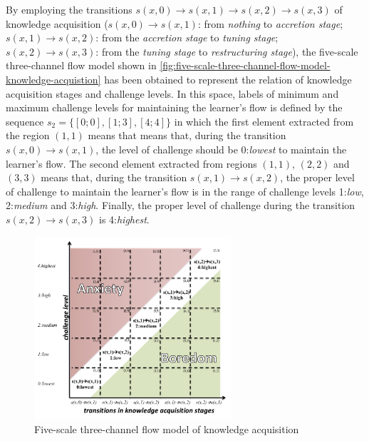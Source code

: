 By employing the transitions $s(x,0) \to s(x,1) \to s(x,2) \to s(x,3)$ of knowledge acquisition ($s(x,0) \to s(x,1)$: from \emph{nothing} to \emph{accretion stage}; $s(x,1) \to s(x,2)$: from the \emph{accretion stage} to \emph{tuning stage}; $s(x,2) \to s(x,3)$: from the \emph{tuning stage} to \emph{restructuring stage}), the five-scale three-channel flow model shown in \autoref{fig:five-scale-three-channel-flow-model-knowledge-acquistion} has been obtained to represent the relation of knowledge acquisition stages and challenge levels. In this space, labels of minimum and maximum challenge levels for maintaining the learner’s flow is defined by the sequence $s_{2} = \{[0;0], [1;3], [4;4]\}$ in which the first element \aspas{$[0;0]$} extracted from the region $(1,1)$ means that means that, during the transition $s(x,0) \to s(x,1)$, the level of challenge should be 0:\emph{lowest} to maintain the learner’s flow. The second element \aspas{$[1;3]$} extracted from regions $(1,1)$, $(2,2)$ and $(3,3)$ means that, during the transition $s(x,1) \to s(x,2)$, the proper level of challenge to maintain the learner’s flow is in the range of challenge levels 1:\emph{low}, 2:\emph{medium} and 3:\emph{high}. Finally, the proper level of challenge during the transition $s(x,2) \to s(x,3)$ is 4:\emph{highest}.

 \begin{figure}[htb]
 \caption{Five-scale three-channel flow model of knowledge acquisition}
 \label{fig:five-scale-three-channel-flow-model-knowledge-acquistion}
 \centering
 \includegraphics[width=0.65\textwidth]{images/chap-model-gmif/five-scale-three-channel-flow-model-knowledge-acquistion.png}
 \fautor
\end{figure}


